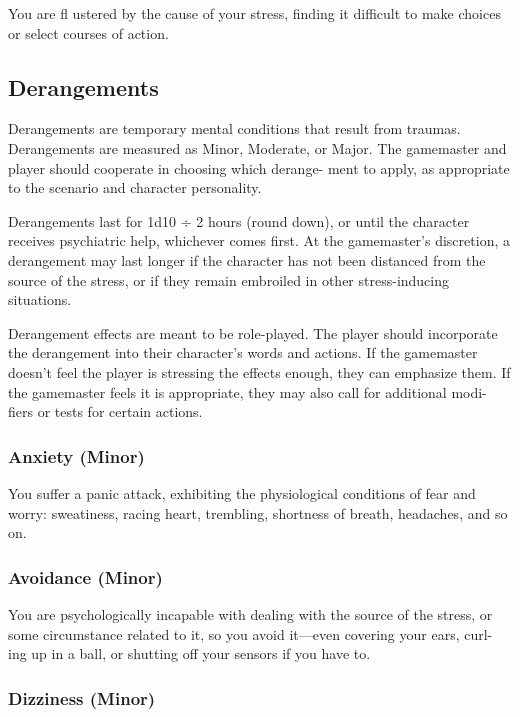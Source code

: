 You are fl ustered by the cause of your stress, finding it 
difficult to make choices or select courses of action.

\subsection{Derangements}

Derangements are temporary mental conditions that 
result from traumas. Derangements are measured as 
Minor, Moderate, or Major. The gamemaster and 
player should cooperate in choosing which derange-
ment to apply, as appropriate to the scenario and 
character personality.

Derangements last for 1d10 ÷ 2 hours (round 
down), or until the character receives psychiatric help, 
whichever comes first. At the gamemaster's discretion, 
a derangement may last longer if the character has not 
been distanced from the source of the stress, or if they 
remain embroiled in other stress-inducing situations.

Derangement effects are meant to be role-played. 
The player should incorporate the derangement into 
their character's words and actions. If the gamemaster 
doesn't feel the player is stressing the effects enough, 
they can emphasize them. If the gamemaster feels it is 
appropriate, they may also call for additional modi-
fiers or tests for certain actions.

\subsubsection{Anxiety (Minor)}

You suffer a panic attack, exhibiting the physiological 
conditions of fear and worry: sweatiness, racing heart, 
trembling, shortness of breath, headaches, and so on.

\subsubsection{Avoidance (Minor)}

You are psychologically incapable with dealing with 
the source of the stress, or some circumstance related 
to it, so you avoid it—even covering your ears, curl-
ing up in a ball, or shutting off your sensors if you 
have to.

\subsubsection{Dizziness (Minor)}

